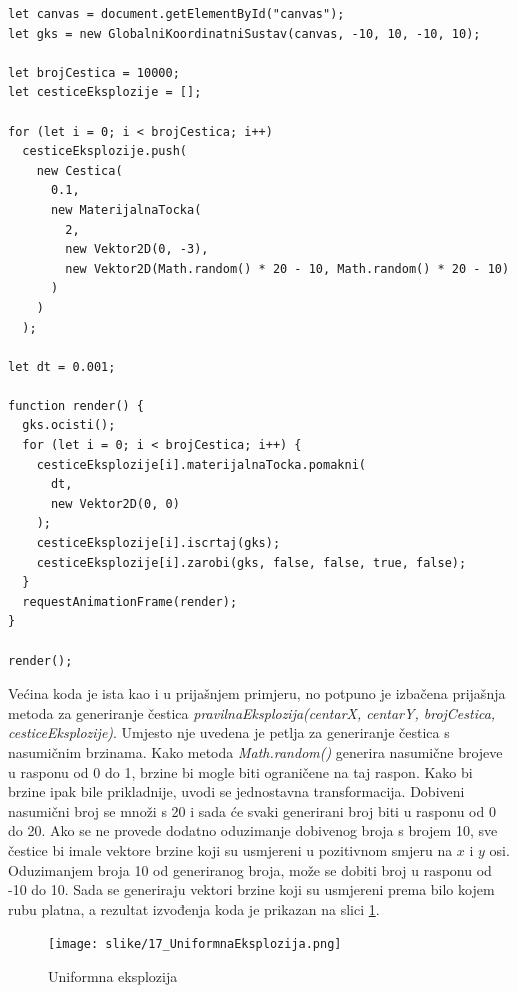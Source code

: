 \documentclass{foi}
\begin{document}
\begin{verbatim}
let canvas = document.getElementById("canvas");
let gks = new GlobalniKoordinatniSustav(canvas, -10, 10, -10, 10);

let brojCestica = 10000;
let cesticeEksplozije = [];

for (let i = 0; i < brojCestica; i++)
  cesticeEksplozije.push(
    new Cestica(
      0.1,
      new MaterijalnaTocka(
        2,
        new Vektor2D(0, -3),
        new Vektor2D(Math.random() * 20 - 10, Math.random() * 20 - 10)
      )
    )
  );

let dt = 0.001;

function render() {
  gks.ocisti();
  for (let i = 0; i < brojCestica; i++) {
    cesticeEksplozije[i].materijalnaTocka.pomakni(
      dt,
      new Vektor2D(0, 0)
    );
    cesticeEksplozije[i].iscrtaj(gks);
    cesticeEksplozije[i].zarobi(gks, false, false, true, false);
  }
  requestAnimationFrame(render);
}

render();

\end{verbatim}
Većina koda je ista kao i u prijašnjem primjeru, no potpuno je izbačena prijašnja metoda za generiranje čestica  \textit{pravilnaEksplozija(centarX, centarY, brojCestica, cesticeEksplozije)}. Umjesto nje uvedena je petlja za generiranje čestica s nasumičnim brzinama. Kako metoda \textit{Math.random()} generira nasumične brojeve u rasponu od 0 do 1, brzine bi mogle biti ograničene na taj raspon. Kako bi brzine ipak bile prikladnije, uvodi se jednostavna transformacija. Dobiveni nasumični broj se množi s 20 i sada će svaki generirani broj biti u rasponu od 0 do 20. Ako se ne provede dodatno oduzimanje dobivenog broja s brojem 10, sve čestice bi imale vektore brzine koji su usmjereni u pozitivnom smjeru na $x$ i $y$ osi. Oduzimanjem broja 10 od generiranog broja, može se dobiti broj u rasponu od -10 do 10. Sada se generiraju vektori brzine koji su usmjereni prema bilo kojem rubu platna, a rezultat izvođenja koda je prikazan na slici \ref{fig:UniformnaEksplozija}.

\begin{figure}[H]
    \centering
    \texttt{[image: slike/17\_UniformnaEksplozija.png]}
    \captionsetup{justification=centering}
    \caption{Uniformna eksplozija}
\label{fig:UniformnaEksplozija}
\end{figure}
\end{document}
